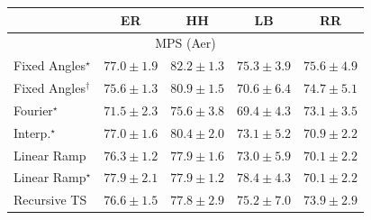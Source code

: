 \begin{tabular}{l|cccc|}
\toprule
            & ER & HH & LB & RR \\
\midrule
\multicolumn{5}{c}{\rule{0pt}{8pt}MPS (Aer)} \\
\midrule
Fixed Angles$^\star$ & {\cellcolor[HTML]{8A55A7}} \color[HTML]{F1F1F1} $77.0\pm 1.9$ & {\cellcolor[HTML]{831F86}} \color[HTML]{F1F1F1} $82.2\pm 1.3$ & {\cellcolor[HTML]{8C66AF}} \color[HTML]{F1F1F1} $75.3\pm 3.9$ & {\cellcolor[HTML]{8B62AD}} \color[HTML]{F1F1F1} $75.6\pm 4.9$ \\
Fixed Angles$^\dagger$ & {\cellcolor[HTML]{8B62AD}} \color[HTML]{F1F1F1} $75.6\pm 1.3$ & {\cellcolor[HTML]{852D90}} \color[HTML]{F1F1F1} $80.9\pm 1.5$ & {\cellcolor[HTML]{8C93C4}} \color[HTML]{F1F1F1} $70.6\pm 6.4$ & {\cellcolor[HTML]{8C6CB1}} \color[HTML]{F1F1F1} $74.7\pm 5.1$ \\
Fourier$^\star$ & {\cellcolor[HTML]{8C8BC0}} \color[HTML]{F1F1F1} $71.5\pm 2.3$ & {\cellcolor[HTML]{8B62AD}} \color[HTML]{F1F1F1} $75.6\pm 3.8$ & {\cellcolor[HTML]{909ECA}} \color[HTML]{F1F1F1} $69.4\pm 4.3$ & {\cellcolor[HTML]{8C7AB8}} \color[HTML]{F1F1F1} $73.1\pm 3.5$ \\
Interp.$^\star$ & {\cellcolor[HTML]{8A55A7}} \color[HTML]{F1F1F1} $77.0\pm 1.6$ & {\cellcolor[HTML]{863394}} \color[HTML]{F1F1F1} $80.4\pm 2.0$ & {\cellcolor[HTML]{8C7AB8}} \color[HTML]{F1F1F1} $73.1\pm 5.2$ & {\cellcolor[HTML]{8C90C3}} \color[HTML]{F1F1F1} $70.9\pm 2.2$ \\
Linear Ramp & {\cellcolor[HTML]{8B5CAA}} \color[HTML]{F1F1F1} $76.3\pm 1.2$ & {\cellcolor[HTML]{894DA3}} \color[HTML]{F1F1F1} $77.9\pm 1.6$ & {\cellcolor[HTML]{8C7CB9}} \color[HTML]{F1F1F1} $73.0\pm 5.9$ & {\cellcolor[HTML]{8D98C7}} \color[HTML]{F1F1F1} $70.1\pm 2.2$ \\
Linear Ramp$^\star$ & {\cellcolor[HTML]{894DA3}} \color[HTML]{F1F1F1} $77.9\pm 2.1$ & {\cellcolor[HTML]{894DA3}} \color[HTML]{F1F1F1} $77.9\pm 1.2$ & {\cellcolor[HTML]{8948A0}} \color[HTML]{F1F1F1} $78.4\pm 4.3$ & {\cellcolor[HTML]{8D98C7}} \color[HTML]{F1F1F1} $70.1\pm 2.2$ \\
Recursive TS & {\cellcolor[HTML]{8A59A8}} \color[HTML]{F1F1F1} $76.6\pm 1.5$ & {\cellcolor[HTML]{894FA3}} \color[HTML]{F1F1F1} $77.8\pm 2.9$ & {\cellcolor[HTML]{8C66AF}} \color[HTML]{F1F1F1} $75.2\pm 7.0$ & {\cellcolor[HTML]{8C74B5}} \color[HTML]{F1F1F1} $73.9\pm 2.9$ \\

\end{tabular}
